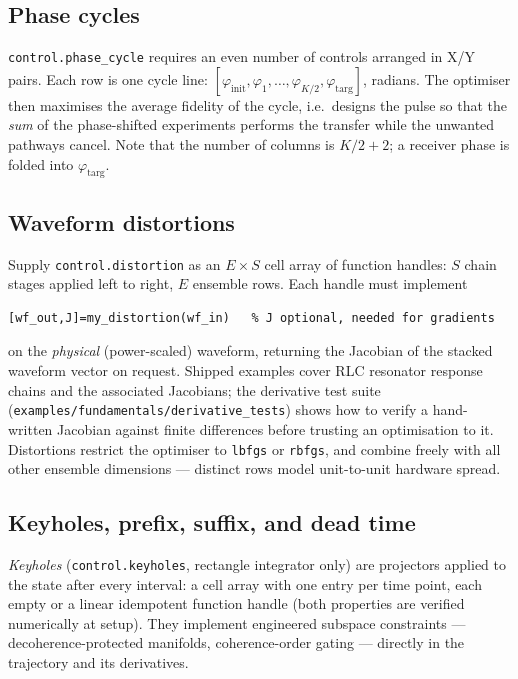 \documentclass[11pt,a4paper]{article}
\newcommand{\code}[1]{\texttt{#1}}
\begin{document}
\subsection{Phase cycles}

\code{control.phase\_cycle} requires an even number of controls arranged
in X/Y pairs. Each row is one cycle line:
$[\varphi_{\mathrm{init}},\varphi_1,\ldots,\varphi_{K/2},
\varphi_{\mathrm{targ}}]$, radians. The optimiser then maximises the
average fidelity of the cycle, i.e.\ designs the pulse so that the
\emph{sum} of the phase-shifted experiments performs the transfer while
the unwanted pathways cancel. Note that the number of columns is
$K/2+2$; a receiver phase is folded into $\varphi_{\mathrm{targ}}$.

\subsection{Waveform distortions}

Supply \code{control.distortion} as an $E\times S$ cell array of function
handles: $S$ chain stages applied left to right, $E$ ensemble rows. Each
handle must implement
\begin{lstlisting}
[wf_out,J]=my_distortion(wf_in)   % J optional, needed for gradients
\end{lstlisting}
on the \emph{physical} (power-scaled) waveform, returning the Jacobian of
the stacked waveform vector on request. Shipped examples cover RLC
resonator response chains and the associated Jacobians; the derivative
test suite (\code{examples/fundamentals/derivative\_tests}) shows how to
verify a hand-written Jacobian against finite differences before trusting
an optimisation to it. Distortions restrict the optimiser to
\code{lbfgs} or \code{rbfgs}, and combine freely with all other ensemble dimensions ---
distinct rows model unit-to-unit hardware spread.

\subsection{Keyholes, prefix, suffix, and dead time}

\emph{Keyholes} (\code{control.keyholes}, rectangle integrator only) are
projectors applied to the state after every interval: a cell array with
one entry per time point, each empty or a linear idempotent function
handle (both properties are verified numerically at setup). They
implement engineered subspace constraints --- decoherence-protected
manifolds, coherence-order gating --- directly in the trajectory and its
derivatives.
\end{document}
